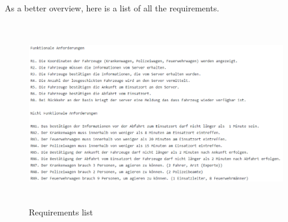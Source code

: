 \documentclass{article}
\begin{document}
\clearpage
As a better overview, here is a list of all the requirements.
\newline
\newline
\begin{figure}[htp]
    \centering
\includegraphics[width=14cm, height=8cm]{images/Ostrzinski/RL}
    \caption{Requirements list}
    \label{fig:GALAXY}
\end{figure}
\clearpage
\end{document}
